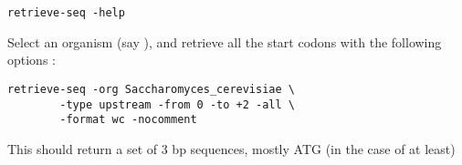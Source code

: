 \begin{lstlisting}
retrieve-seq -help
\end{lstlisting}


Select an organism (say ), and
retrieve all the start codons with the following options :

\begin{lstlisting}
retrieve-seq -org Saccharomyces_cerevisiae \
        -type upstream -from 0 -to +2 -all \
        -format wc -nocomment
\end{lstlisting}


This should return a set of 3 bp sequences, mostly ATG (in the case of
 at least)


